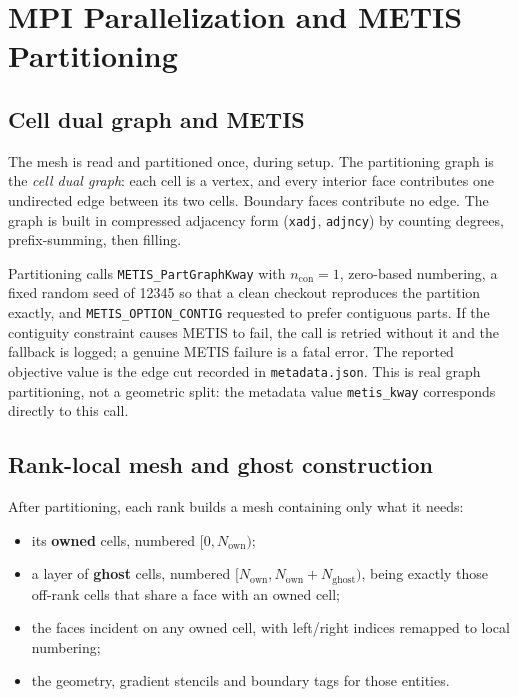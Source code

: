 \section{MPI Parallelization and METIS Partitioning}
\label{sec:mpi}

\subsection{Cell dual graph and METIS}

The mesh is read and partitioned once, during setup. The partitioning graph is
the \emph{cell dual graph}: each cell is a vertex, and every interior face
contributes one undirected edge between its two cells. Boundary faces contribute
no edge. The graph is built in compressed adjacency form (\texttt{xadj},
\texttt{adjncy}) by counting degrees, prefix-summing, then filling.

Partitioning calls \texttt{METIS\_PartGraphKway} with $n_{\mathrm{con}}=1$,
zero-based numbering, a fixed random seed of \num{12345} so that a clean checkout
reproduces the partition exactly, and \texttt{METIS\_OPTION\_CONTIG} requested to
prefer contiguous parts. If the contiguity constraint causes METIS to fail, the
call is retried without it and the fallback is logged; a genuine METIS failure is
a fatal error. The reported objective value is the edge cut recorded in
\texttt{metadata.json}. This is real graph partitioning, not a geometric split:
the metadata value \texttt{metis\_kway} corresponds directly to this call.

\subsection{Rank-local mesh and ghost construction}

After partitioning, each rank builds a mesh containing only what it needs:

\begin{itemize}
  \item its \textbf{owned} cells, numbered $[0,N_{\mathrm{own}})$;
  \item a layer of \textbf{ghost} cells, numbered $[N_{\mathrm{own}},N_{\mathrm{own}}+N_{\mathrm{ghost}})$,
  being exactly those off-rank cells that share a face with an owned cell;
  \item the faces incident on any owned cell, with left/right indices remapped to
  local numbering;
  \item the geometry, gradient stencils and boundary tags for those entities.
\end{itemize}

